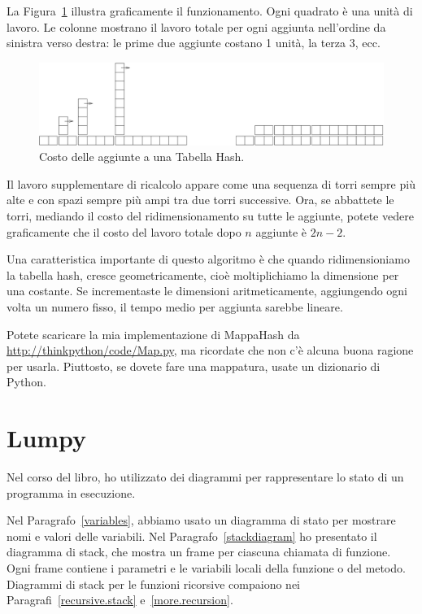 \documentclass[10pt]{book}
\begin{document}
La Figura~\ref{fig.hash} illustra graficamente il funzionamento. Ogni quadrato è una unità di lavoro. Le colonne mostrano il lavoro totale per ogni aggiunta nell'ordine da sinistra verso destra: le prime due aggiunte costano 1 unità, la terza 3, ecc.

\begin{figure}
\centerline{\includegraphics[scale=0.6]{figs/towers.pdf}}
\caption{Costo delle aggiunte a una Tabella Hash.\label{fig.hash}}
\end{figure}

Il lavoro supplementare di ricalcolo appare come una sequenza di torri sempre più alte e con spazi sempre più ampi tra due torri successive. Ora, se abbattete le torri, mediando il costo del ridimensionamento su tutte le aggiunte, potete vedere graficamente che il costo del lavoro totale dopo $n$ aggiunte è $2n - 2$.

Una caratteristica importante di questo algoritmo è che quando ridimensioniamo la tabella hash, cresce geometricamente, cioè moltiplichiamo la dimensione per una costante. Se incrementaste le dimensioni aritmeticamente, aggiungendo ogni volta un numero fisso, il tempo medio per aggiunta sarebbe lineare.

Potete scaricare la mia implementazione di MappaHash da
\url{http://thinkpython/code/Map.py}, ma ricordate che non c'è alcuna buona ragione per usarla. Piuttosto, se dovete fare una mappatura, usate un dizionario di Python.






\chapter{Lumpy}
\label{lumpy}

Nel corso del libro, ho utilizzato dei diagrammi per rappresentare lo stato di un programma in esecuzione.

Nel Paragrafo~\ref{variables}, abbiamo usato un diagramma di stato per mostrare nomi e valori delle variabili.  Nel Paragrafo~\ref{stackdiagram} ho presentato il diagramma di stack, che mostra un frame per ciascuna chiamata di funzione. Ogni frame contiene i parametri e le variabili locali della funzione o del metodo. Diagrammi di stack per le funzioni ricorsive compaiono nei Paragrafi~\ref{recursive.stack} e~\ref{more.recursion}.
 
 
\end{document}
